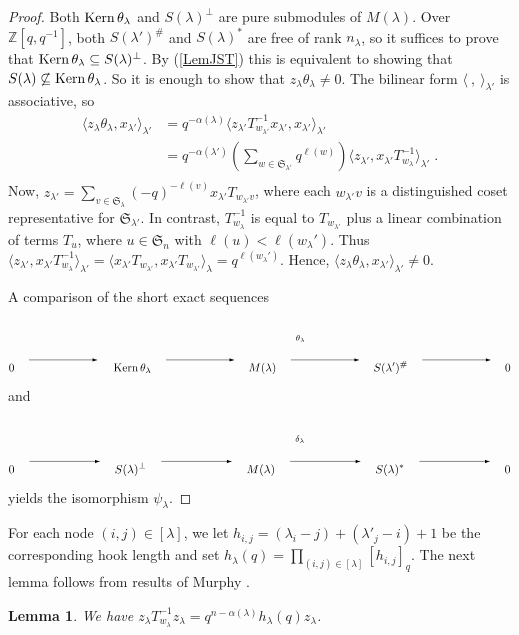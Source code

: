 \documentclass[twoside]{amsart}
\newcommand{\lra}{\begin{picture}(80,17)
                  \put(10,10){\vector(1,0){60}}
                  \end{picture}}
\newcommand{\lraa}[1]{\begin{picture}(80,50)      %
                      \put(  10,  10){\vector(1,0){60}}
                      \put(  10,  27){\makebox[6mm]{$\scriptstyle #1$}}
                      \end{picture} }
\numberwithin{equation}{section}
\newtheorem{Lemma}[equation]{Lemma}
\theoremstyle{remark}
\def\Sum{\displaystyle\sum}
\let\>\rangle
\let\<\langle
\let\ss\subseteq
\def\Kern{\mathop{\rm Kern}\nolimits}
\def\Z{{\mathbb Z}}
\def\len(#1){\ell(#1)}
\def\Sym{\mathfrak S}
\begin{document}
\begin{proof}
Both $\Kern\theta_\lambda$ and $S(\lambda)^\perp$ are pure submodules
of $M(\lambda)$.  Over $\Z[q,q^{-1}]$, both $S(\lambda')^\#$ and
$S(\lambda)^*$ are free of rank $n_\lambda$, so it suffices to prove
that $\Kern\theta_\lambda\ss S(\lambda)^\perp$. By (\ref{LemJST}) this
is equivalent to showing that $S(\lambda)\not\ss \Kern\theta_\lambda$.
So it is enough to show that $z_\lambda \theta_\lambda \neq 0$. 
The bilinear form $\<\ ,\ \>_{\lambda'}$ is associative, so
\begin{align*}
\<z_\lambda \theta_\lambda, x_{\lambda'}\>_{\lambda'}
& =  q^{-\alpha(\lambda)}\< z_{\lambda'} T_{w_{\lambda'}}^{-1} x_{\lambda'} , x_{\lambda'}\>_{\lambda'} \\
& =  q^{-\alpha(\lambda')}(\Sum_{w\in\Sym_{\lambda'}} q^{\len(w)})\<z_{\lambda'}, x_{\lambda'} T_{w_\lambda}^{-1}\>_{\lambda'}\; . \\
\end{align*}
Now, 
$z_{\lambda'} = \sum_{v\in\Sym_\lambda}(-q)^{-\len(v)} x_{\lambda'} T_{w_{\lambda'} v}$, where each $w_{\lambda'} v$ is a distinguished coset representative for 
$\Sym_{\lambda'}$. In contrast, $T_{w_\lambda}^{-1}$ is equal to
$T_{w_{\lambda'}}$ plus a linear combination of terms $T_u$, where
$u\in\Sym_n$ with $\len(u) < \len(w_{\lambda'})$. Thus
$\<z_{\lambda'}, x_{\lambda'} T_{w_\lambda}^{-1}\>_{\lambda'} 
       =\<x_{\lambda'} T_{w_{\lambda'}}, x_{\lambda'} T_{w_{\lambda'}}\>_\lambda 
       = q^{\len(w_{\lambda'})}$. 
Hence, $\<z_\lambda \theta_\lambda, x_{\lambda'}\>_{\lambda'} \neq 0$.

A comparison of the short exact sequences
$$
0\;\lra\;\Kern\theta_\lambda\;\lra\; M(\lambda) \;\lraa{\theta_\lambda}\; S(\lambda')^\# \;\lra\; 0 
$$
and 
$$
0\;\lra\; S(\lambda)^\perp\;\lra\; M(\lambda) \;\lraa{\delta_\lambda}\; S(\lambda)^*\;\lra\; 0
$$
yields the isomorphism $\psi_\lambda$.
\end{proof}

For each node $(i,j)\in [\lambda]$, we let 
$h_{i,j} = (\lambda_i - j) + (\lambda'_j - i)+1$ be the corresponding
hook length and set 
$h_{\lambda}(q) = \prod_{(i,j)\in [\lambda]} [h_{i,j}]_q$. The next
lemma follows from results of {Murphy} \cite{murphy:hecke}.

\begin{Lemma}\label{scalar}
We have $z_\lambda T_{w_\lambda}^{-1} z_\lambda = q^{n - \alpha(\lambda)} h_\lambda(q) z_\lambda$. 
\end{Lemma}
\end{document}

